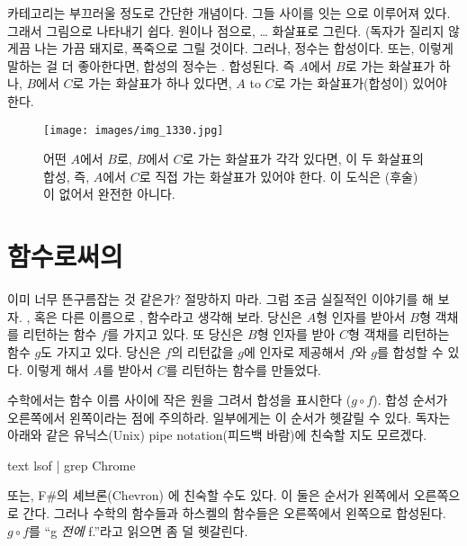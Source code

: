 
\lettrine[lhang=0.17]{카}{테고리}는 부끄러울 정도로 간단한 개념이다.
 \newterm{\trObject}\와 그들 사이를 잇는 \newterm{\trArrow}으로 이루어져 있다. 
그래서 \trCategory\는 그림으로 나타내기 쉽다.  원이나 점으로, 
\trArrow\는 \ldots{} 화살표로 그린다. (독자가 질리지 않게끔 
나는 가끔 \trObject\는 돼지로, \trArrow\는 폭죽으로 그릴 것이다.
그러나,  정수는 합성이다. 또는, 이렇게 말하는 걸 더 좋아한다면, 합성의 정수는 .
\trArrow\는 합성된다. 
즉 \trObject $A$에서 \trObject $B$로 가는 화살표가 하나, \trObject $B$에서 \trObject $C$로 가는 화살표가 하나 있다면, 
$A$ to $C$로 가는 화살표가(합성이) 있어야 한다.

\begin{figure}
\centering
\texttt{[image: images/img\_1330.jpg]}
\caption{어떤  $A$에서 $B$로, $B$에서 $C$로 가는 화살표가 각각 있다면,
이 두 화살표의 합성, 즉, $A$에서 $C$로 직접 가는 화살표가 있어야 한다.
이 도식은 \trIdentityMorphism(후술)이 없어서 완전한  아니다.}
\end{figure}

\section{함수로써의 \trArrow}

이미 너무 뜬구름잡는 것 같은가? 절망하지 마라. 그럼 조금 실질적인 이야기를 해 보자.
\trArrow\를, 혹은 다른 이름으로 \newterm{\trMorphism}\을, 함수라고 생각해 보라.
당신은 $A$형 인자를 받아서 $B$형 객채를 리턴하는 함수 $f$를 가지고 있다.
또 당신은 $B$형 인자를 받아 $C$형 객채를 리턴하는 함수 $g$도 가지고 있다.
당신은 $f$의 리턴값을 $g$에 인자로 제공해서 $f$와 $g$를 합성할 수 있다.
이렇게 해서 $A$를 받아서 $C$를 리턴하는 함수를 만들었다.

수학에서는 함수 이름 사이에 작은 원을 그려서 합성을 표시한다 ($g \circ f$). 
합성 순서가 오른쪽에서 왼쪽이라는 점에 주의하라. 일부에게는 이 순서가 헷갈릴 수 있다.
독자는 아래와 같은 유닉스(Unix) pipe notation(피드백 바람)에 친숙할 지도 모르겠다.

\begin{snip}{text}
lsof | grep Chrome
\end{snip}

또는, F\#의 셰브론(Chevron) \code{>>}에 친숙할 수도 있다. 이 둘은 순서가 왼쪽에서 오른쪽으로 간다.
그러나 수학의 함수들과 하스켈의 함수들은 오른쪽에서 왼쪽으로 합성된다.
$g \circ f$를 ``g \emph{전에} f.''라고 읽으면 좀 덜 헷갈린다.

